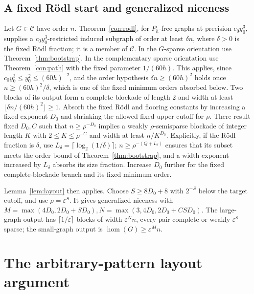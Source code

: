 \documentclass[11pt,a4paper]{article}
\theoremstyle{definition}
\theoremstyle{remark}
\numberwithin{equation}{section}
\begin{document}
\subsection{A fixed R\"odl start and generalized niceness}\label{subsec:rodl-start}
Let \(G\in\mathcal C\) have order \(n\). Theorem~\ref{con:rodl}, for \(\overline{P_{h}}\)-free graphs at precision \(c_{0} y_{0}^{3}\), supplies a \(c_{0} y_{0}^{3}\)-restricted induced subgraph of order at least \(\delta n\), where \(\delta>0\) is the fixed R\"odl fraction; it is a member of \(\mathcal C\). In the \(G\)-sparse orientation use Theorem~\ref{thm:bootstrap}. In the complementary sparse orientation use Theorem~\ref{con:path} with the fixed parameter \(1/(60h)\). This applies, since \(c_{0}y_{0}^{3}\le y_{0}^{2}\le (60h)^{-2}\), and the order hypothesis \(\delta n\ge (60h)^{2}\) holds once \(n\ge (60h)^{2}/\delta\), which is one of the fixed minimum orders absorbed below. Two blocks of its output form a complete blockade of length \(2\) and width at least \(\lfloor \delta n/(60h)^{2}\rfloor\ge1\). Absorb the fixed R\"odl and flooring constants by increasing a fixed exponent \(D_{0}\) and shrinking the allowed fixed upper cutoff for \(\rho\). There result fixed \(D_{0},\allowbreak C\) such that \(n\ge\allowbreak \rho^{-D_{0}}\) implies a weakly \(\rho\)-semisparse blockade of integer length \(K\) with \(2\le\allowbreak K\le\allowbreak \rho^{-C}\) and width at least \(n/K^{D_{0}}\). Explicitly, if the R\"odl fraction is \(\delta\), use \(L_{\delta}=\lceil \log _{2}(1/\delta)\rceil\); \(n\ge\allowbreak \rho^{-(Q+L_{\delta})}\) ensures that its subset meets the order bound of Theorem~\ref{thm:bootstrap}, and a width exponent increased by \(L_{\delta}\) absorbs its size fraction. Increase \(D_{0}\) further for the fixed complete-blockade branch and its fixed minimum order.

Lemma~\ref{lem:layout} then applies. Choose \(S\ge\allowbreak 8D_{0}+8\) with \(2^{-S}\) below the target cutoff, and use \(\rho=\varepsilon^{S}\). It gives generalized niceness with \(M=\max (4D_{0},\allowbreak 2D_{0}+S D_{0}),\allowbreak  N=\max (3,\allowbreak 4D_{0},\allowbreak 2D_{0}+C S D_{0})\). The large-graph output has \(\lceil 1/\varepsilon\rceil\) blocks of width \(\varepsilon^{N} n\), every pair complete or weakly \(\varepsilon^{8}\)-sparse; the small-graph output is \(\hom (G)\ge\allowbreak \varepsilon^{M} n\).

\section{The arbitrary-pattern layout argument}\label{app:layout}
\end{document}
